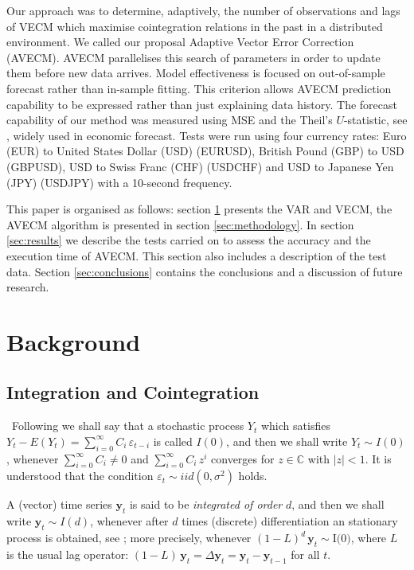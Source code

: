 Our approach was to determine, adaptively, the number of observations and lags of
VECM which maximise cointegration relations in the past in a distributed
environment. We called our proposal Adaptive Vector Error Correction (AVECM). 
AVECM parallelises this search of parameters in order to update them
before new data arrives. Model effectiveness is focused on out-of-sample
forecast rather than in-sample fitting. This criterion allows AVECM prediction
capability to be expressed rather than just explaining data history.  The
forecast capability of our method was measured using MSE and the Theil's
$U$-statistic, see \cite{theil1966}, widely used in economic forecast. Tests
were run using four currency rates: Euro (EUR) to United States Dollar (USD)
(EURUSD), British Pound (GBP) to USD (GBPUSD), USD to Swiss Franc (CHF) (USDCHF)
and USD to Japanese Yen (JPY) (USDJPY) with a 10-second frequency.

This paper is organised as follows: section \ref{sec:background} presents the
VAR and VECM, the AVECM algorithm is presented in section \ref{sec:methodology}.
In section \ref{sec:results} we describe the tests carried on to assess the
accuracy and the execution time of AVECM.  This section also includes a
description of the test data.  Section \ref{sec:conclusions} contains the
conclusions and a discussion of future research.

\section{Background}
\label{sec:background}

\subsection{Integration and Cointegration}\label{sec:coint}\  
Following \cite{johansen1995} we shall say that a stochastic process
$Y_t$ which satisfies $Y_t-E(Y_t) = \sum_{i=0}^\infty C_i\,\varepsilon_{t-i}$ is
called $I(0)$, and then we shall write $Y_t\sim I(0)$, whenever
$\sum_{i=0}^\infty C_i \neq 0$ and $\sum_{i=0}^\infty C_i\,z^i$ converges for
$z\in\mathbb{C}$ with $|z|<1$.  It is understood that the condition
$\varepsilon_t\sim iid(0,\sigma^2)$ holds.

A (vector) time series $\mathbf{y}_t$ is said to be {\em integrated of order\/}
$d$, and then we shall write $\mathbf{y}_t\sim I(d)$, whenever after $d$ times
(discrete) differentiation an stationary process is
obtained, see \cite{banerjee1993}; more precisely, whenever
$(1-L)^d\,\mathbf{y}_t\sim\text{I(0)}$, where $L$ is the usual lag operator:
$(1-L)\,\mathbf{y}_t = \Delta\mathbf{y}_t = \mathbf{y}_t-\mathbf{y}_{t-1}$ for
all $t$.  

